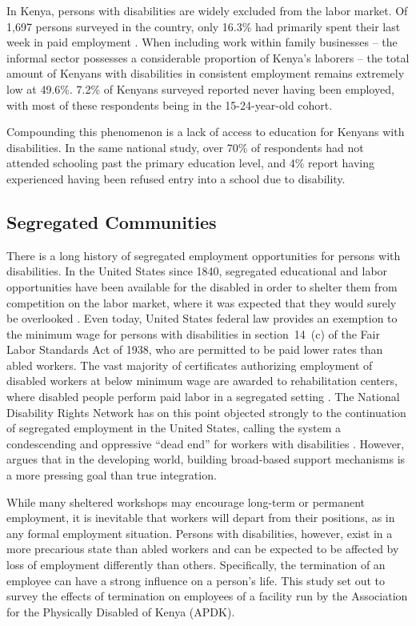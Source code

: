 \documentclass{../../../coursework}
\begin{document}
In Kenya, persons with disabilities are widely excluded from the labor market.
Of 1,697 persons surveyed in the country, only 16.3\% had primarily spent
their last week in paid employment \parencite{2008}. When including work
within family businesses -- the informal sector possesses a considerable
proportion of Kenya's laborers \parencite{Livingstone1991} -- the total amount
of Kenyans with disabilities in consistent employment remains extremely low at
49.6\%. 7.2\% of Kenyans surveyed reported never having been employed, with
most of these respondents being in the 15-24-year-old cohort.

Compounding this phenomenon is a lack of access to education for Kenyans with
disabilities. In the same national study, over 70\% of respondents had not
attended schooling past the primary education level, and 4\% report having
experienced having been refused entry into a school due to disability. 

\subsection{Segregated Communities}

There is a long history of segregated employment opportunities for persons
with disabilities. In the United States since 1840, segregated educational and
labor opportunities have been available for the disabled in order to shelter
them from competition on the labor market, where it was expected that they
would surely be overlooked \parencite{2011}. Even today, United States federal
law provides an exemption to the minimum wage for persons with disabilities in
section~14~(c) of the Fair Labor Standards Act of 1938, who are permitted to
be paid lower rates than abled workers. The vast majority of certificates
authorizing employment of disabled workers at below minimum wage are awarded
to rehabilitation centers, where disabled people perform paid labor in a
segregated setting \parencite{1991}. The National Disability Rights Network
has on this point objected strongly to the continuation of segregated
employment in the United States, calling the system a condescending and
oppressive ``dead end'' for workers with disabilities \parencite[32]{2011}.
However, \textcite{Cobley2012} argues that in the developing world, building
broad-based support mechanisms is a more pressing goal than true integration.

While many sheltered workshops may encourage long-term or permanent
employment, it is inevitable that workers will depart from their positions, as
in any formal employment situation. Persons with disabilities, however, exist
in a more precarious state than abled workers and can be expected to be
affected by loss of employment differently than others. Specifically, the
termination of an employee can have a strong influence on a person's life.
This study set out to survey the effects of termination on employees of a
facility run by the Association for the Physically Disabled of Kenya (APDK).
\end{document}
